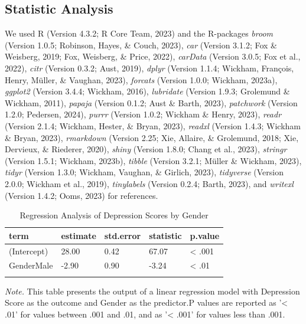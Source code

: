 \documentclass[
  man,floatsintext]{apa6}
\begin{document}
\hypertarget{statistic-analysis}{%
\subsection{Statistic Analysis}\label{statistic-analysis}}

We used R (Version 4.3.2; R Core Team, 2023) and the R-packages \emph{broom} (Version 1.0.5; Robinson, Hayes, \& Couch, 2023), \emph{car} (Version 3.1.2; Fox \& Weisberg, 2019; Fox, Weisberg, \& Price, 2022), \emph{carData} (Version 3.0.5; Fox et al., 2022), \emph{citr} (Version 0.3.2; Aust, 2019), \emph{dplyr} (Version 1.1.4; Wickham, François, Henry, Müller, \& Vaughan, 2023), \emph{forcats} (Version 1.0.0; Wickham, 2023a), \emph{ggplot2} (Version 3.4.4; Wickham, 2016), \emph{lubridate} (Version 1.9.3; Grolemund \& Wickham, 2011), \emph{papaja} (Version 0.1.2; Aust \& Barth, 2023), \emph{patchwork} (Version 1.2.0; Pedersen, 2024), \emph{purrr} (Version 1.0.2; Wickham \& Henry, 2023), \emph{readr} (Version 2.1.4; Wickham, Hester, \& Bryan, 2023), \emph{readxl} (Version 1.4.3; Wickham \& Bryan, 2023), \emph{rmarkdown} (Version 2.25; Xie, Allaire, \& Grolemund, 2018; Xie, Dervieux, \& Riederer, 2020), \emph{shiny} (Version 1.8.0; Chang et al., 2023), \emph{stringr} (Version 1.5.1; Wickham, 2023b), \emph{tibble} (Version 3.2.1; Müller \& Wickham, 2023), \emph{tidyr} (Version 1.3.0; Wickham, Vaughan, \& Girlich, 2023), \emph{tidyverse} (Version 2.0.0; Wickham et al., 2019), \emph{tinylabels} (Version 0.2.4; Barth, 2023), and \emph{writexl} (Version 1.4.2; Ooms, 2023) for references.

\begin{table}[tbp]

\begin{center}
\begin{threeparttable}

\caption{\label{tab:regression-depression-gender}Regression Analysis of Depression Scores by Gender}

\begin{tabular}{lllll}
\toprule
term & \multicolumn{1}{c}{estimate} & \multicolumn{1}{c}{std.error} & \multicolumn{1}{c}{statistic} & \multicolumn{1}{c}{p.value}\\
\midrule
(Intercept) & 28.00 & 0.42 & 67.07 & < .001\\
GenderMale & -2.90 & 0.90 & -3.24 & < .01\\
\bottomrule
\addlinespace
\end{tabular}

\begin{tablenotes}[para]
\normalsize{\textit{Note.} This table presents the output of a linear regression model with Depression Score as the outcome and Gender as the predictor.P values are reported as '< .01' for values between .001 and .01, and as '< .001' for values less than .001.}
\end{tablenotes}

\end{threeparttable}
\end{center}

\end{table}
\end{document}
